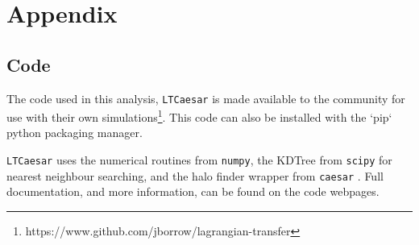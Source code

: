\section{Appendix}

\subsection{Code}

The code used in this analysis, {\tt LTCaesar} is made available to the community for use with their own simulations\footnote{https://www.github.com/jborrow/lagrangian-transfer}. This code can also be installed with the `pip` python packaging manager.

{\tt LTCaesar} uses the numerical routines from {\tt numpy}, the KDTree from {\tt scipy} for nearest neighbour searching, and the halo finder wrapper from {\tt caesar} \citep{numpy, scipy, caesar}. Full documentation, and more information, can be found on the code webpages.